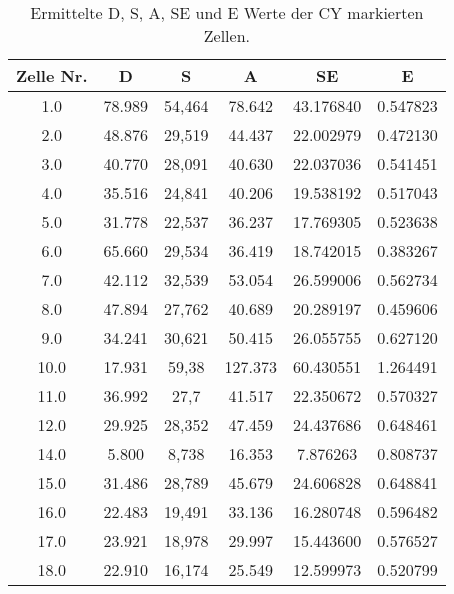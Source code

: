 \begin{table}[h]
    \centering
    \begin{tabular}{c|c|c|c|c|c}
         Zelle Nr. &       D &            S &        A &         SE &         E \\\hline\hline
               1.0 &  78.989 &       54,464 &   78.642 &  43.176840 &  0.547823 \\\hline
               2.0 &  48.876 &       29,519 &   44.437 &  22.002979 &  0.472130 \\\hline
               3.0 &  40.770 &       28,091 &   40.630 &  22.037036 &  0.541451 \\\hline
               4.0 &  35.516 &       24,841 &   40.206 &  19.538192 &  0.517043 \\\hline
               5.0 &  31.778 &       22,537 &   36.237 &  17.769305 &  0.523638 \\\hline
               6.0 &  65.660 &       29,534 &   36.419 &  18.742015 &  0.383267 \\\hline
               7.0 &  42.112 &       32,539 &   53.054 &  26.599006 &  0.562734 \\\hline
               8.0 &  47.894 &       27,762 &   40.689 &  20.289197 &  0.459606 \\\hline
               9.0 &  34.241 &       30,621 &   50.415 &  26.055755 &  0.627120 \\\hline
              10.0 &  17.931 &        59,38 &  127.373 &  60.430551 &  1.264491 \\\hline
              11.0 &  36.992 &         27,7 &   41.517 &  22.350672 &  0.570327 \\\hline
              12.0 &  29.925 &       28,352 &   47.459 &  24.437686 &  0.648461 \\\hline
              14.0 &   5.800 &        8,738 &   16.353 &   7.876263 &  0.808737 \\\hline
              15.0 &  31.486 &       28,789 &   45.679 &  24.606828 &  0.648841 \\\hline
              16.0 &  22.483 &       19,491 &   33.136 &  16.280748 &  0.596482 \\\hline
              17.0 &  23.921 &       18,978 &   29.997 &  15.443600 &  0.576527 \\\hline
              18.0 &  22.910 &       16,174 &   25.549 &  12.599973 &  0.520799 \\\hline
        \end{tabular}
        \caption{Ermittelte D, S, A, SE und E Werte der CY markierten Zellen.}
        \label{tab:CYSEE}
\end{table}

